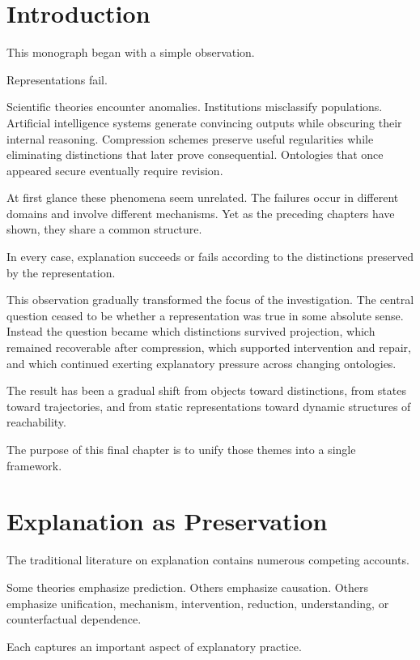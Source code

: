 \documentclass[11pt,oneside,openany]{book}
\begin{document}
\section{Introduction}

This monograph began with a simple observation.

Representations fail.

Scientific theories encounter anomalies. Institutions misclassify populations. Artificial intelligence systems generate convincing outputs while obscuring their internal reasoning. Compression schemes preserve useful regularities while eliminating distinctions that later prove consequential. Ontologies that once appeared secure eventually require revision.

At first glance these phenomena seem unrelated. The failures occur in different domains and involve different mechanisms. Yet as the preceding chapters have shown, they share a common structure.

In every case, explanation succeeds or fails according to the distinctions preserved by the representation.

This observation gradually transformed the focus of the investigation. The central question ceased to be whether a representation was true in some absolute sense. Instead the question became which distinctions survived projection, which remained recoverable after compression, which supported intervention and repair, and which continued exerting explanatory pressure across changing ontologies.

The result has been a gradual shift from objects toward distinctions, from states toward trajectories, and from static representations toward dynamic structures of reachability.

The purpose of this final chapter is to unify those themes into a single framework.

\section{Explanation as Preservation}

The traditional literature on explanation contains numerous competing accounts.

Some theories emphasize prediction. Others emphasize causation. Others emphasize unification, mechanism, intervention, reduction, understanding, or counterfactual dependence.

Each captures an important aspect of explanatory practice.
\end{document}

